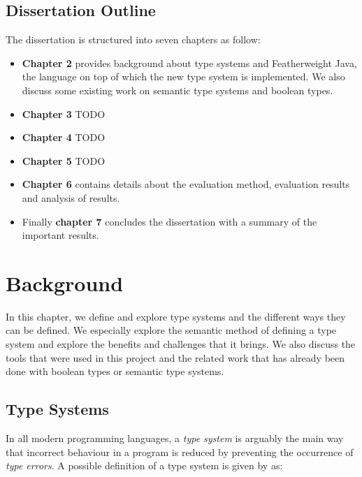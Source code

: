 \documentclass{l4proj}
\begin{document}
\section{Dissertation Outline}

The dissertation is structured into seven chapters as follow:

\begin{itemize}
    \item
          \textbf{Chapter 2} provides background about type systems and Featherweight Java, the language on top of which the new type system is implemented.
          We also discuss some existing work on semantic type systems and boolean types.
    \item
          \textbf{Chapter 3} TODO
    \item
          \textbf{Chapter 4} TODO
    \item
          \textbf{Chapter 5} TODO
    \item
          \textbf{Chapter 6} contains details about the evaluation method, evaluation results and analysis of results.
    \item
          Finally \textbf{chapter 7} concludes the dissertation with a summary of the important results.
\end{itemize}


\chapter{Background}

In this chapter, we define and explore type systems and the different ways they can be defined. We especially explore the semantic method of defining a type system and explore the benefits and challenges that it brings. We also discuss the tools that were used in this project and the related work that has already been done with boolean types or semantic type systems.

\section{Type Systems}

In all modern programming languages, a \emph{type system} is arguably the main way that incorrect behaviour in a program is reduced by preventing the occurrence of \emph{type errors}.
A possible definition of a type system is given by \citet{Pierce2002} as:
\end{document}
